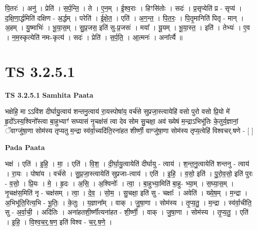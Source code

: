 \documentclass[17pt]{extarticle}
\begin{document}
पि॒तरः॑ । अनु॑ । प्रेति॑ । स॒र्प॒न्ति॒ । ते । ए॒न॒म् । ई॒श्व॒राः । हिꣳसि॑तोः । सदः॑ । प्र॒सृप्येति॑ प्र - सृप्य॑ । द॒क्षि॒णा॒र्द्धमिति॑ दक्षिण - अ॒र्द्धम् । परेति॑ । ई॒क्षे॒त॒ । एति॑ । अ॒ग॒न्त॒ । पि॒त॒रः॒ । पि॒तृ॒मानिति॑ पितृ - मान् । अ॒हम् । यु॒ष्माभिः॑ । भू॒या॒स॒म् । सु॒प्र॒जस॒ इति॑ सु-प्र॒जसः॑ । मया᳚ । यू॒यम् । भू॒या॒स्त॒ । इति॑ । तेभ्यः॑ । ए॒व । न॒म॒स्कृत्येति॑ नमः-कृत्य॑ । सदः॑ । प्रेति॑ । स॒र्प॒ति॒ । आ॒त्मनः॑ । अना᳚र्त्यै ॥  \newline




\section*{ TS 3.2.5.1 }

\textbf{TS 3.2.5.1 } \newline
\textbf{Samhita Paata} \newline

भक्षेहि॒ मा ऽऽवि॑श दीर्घायु॒त्वाय॑ शन्तनु॒त्वाय॑ रा॒यस्पोषा॑य॒ वर्च॑से सुप्रजा॒स्त्वायेहि॑ वसो पुरो वसो प्रि॒यो मे॑ हृ॒दो᳚ऽस्य॒श्विनो᳚स्त्वा बा॒हुभ्याꣳ॑ सघ्यासं नृ॒चक्ष॑सं त्वा देव सोम सु॒चक्षा॒ अव॑ ख्येषं म॒न्द्राऽभिभू॑तिः के॒तुर्य॒ज्ञानां॒ ॅवाग्जु॑षा॒णा सोम॑स्य तृप्यतु म॒न्द्रा स्व॑र्वा॒च्यदि॑ति॒रना॑हत शीर्ष्णी॒ वाग्जु॑षा॒णा सोम॑स्य तृप्य॒त्वेहि॑ विश्वचर्.षणे - [  ] \newline

\textbf{Pada Paata} \newline

भक्ष॑ । एति॑ । इ॒हि॒ । मा॒ । एति॑ । वि॒श॒ । दी॒र्घा॒यु॒त्वायेति॑ दीर्घायु - त्वाय॑ । श॒न्त॒नु॒त्वायेति॑ शन्तनु - त्वाय॑ । रा॒यः । पोषा॑य । वर्च॑से । सु॒प्र॒जा॒स्त्वायेति॑ सुप्रजाः-त्वाय॑ । एति॑ । इ॒हि॒ । व॒सो॒ इति॑ । पु॒रो॒व॒सो॒ इति॑ पुरः - व॒सो॒ । प्रि॒यः । मे॒ । हृ॒दः । अ॒सि॒ । अ॒श्विनोः᳚ । त्वा॒ । बा॒हुभ्या॒मिति॑ बा॒हु- भ्या॒म् । स॒घ्या॒स॒म् । नृ॒चक्ष॑स॒मिति॑ नृ - चक्ष॑सम् । त्वा॒ । दे॒व॒ । सो॒म॒ । सु॒चक्षा॒ इति॑ सु - चक्षाः᳚ । अवेति॑ । ख्ये॒ष॒म् । म॒न्द्रा । अ॒भिभू॑ति॒रित्य॒भि - भू॒तिः॒ । के॒तुः । य॒ज्ञाना᳚म् । वाक् । जु॒षा॒णा । सोम॑स्य । तृ॒प्य॒तु॒ । म॒न्द्रा । स्व॑र्वा॒चीति॒ सु - अ॒र्वा॒ची॒ । अदि॑तिः । अना॑हतशी॒र्ष्णीत्यना॑हत - शी॒र्ष्णी॒ । वाक् । जु॒षा॒णा । सोम॑स्य । तृ॒प्य॒तु॒ । एति॑ । इ॒हि॒ । वि॒श्व॒च॒र्॒.ष॒ण॒ इति॑ विश्व - च॒र्॒.ष॒णे॒ ।  \newline




\end{document}
